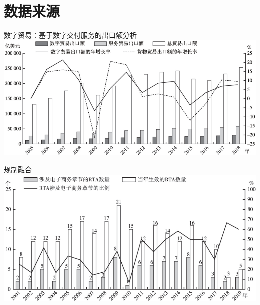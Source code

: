 \documentclass{beamer}
\begin{document}
\section{数据来源}
\begin{frame}{数字贸易：基于数字交付服务的出口额分析}
    \includegraphics[width=\textwidth]{pic/Fig1.png}
    \begin{center}
    \end{center}
\end{frame}

\begin{frame}{规制融合}
    \includegraphics[width=\textwidth]{pic/Fig2.png}
    \begin{center}
    \end{center}
\end{frame}
\end{document}
